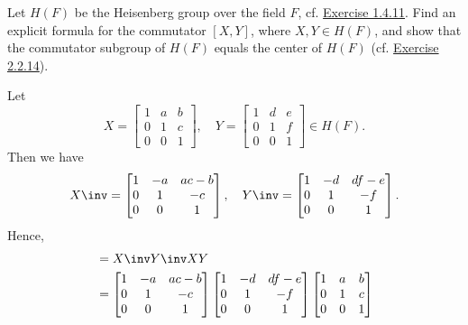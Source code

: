 \begin{exercise}\label{ex5.4.20}
    Let $H(F)$ be the Heisenberg group over the field $F$, cf. \hyperref[ex1.4.11]{Exercise 1.4.11}. Find an explicit formula for the commutator $[X, Y]$, where $X, Y \in H(F)$, and show that the commutator subgroup of $H(F)$ equals the center of $H(F)$ (cf. \hyperref[ex2.2.14]{Exercise 2.2.14}).
\end{exercise}

\begin{sol}
    Let
    \[X = 
    \begin{bmatrix}
        1 & a & b \\
        0 & 1 & c \\
        0 & 0 & 1
    \end{bmatrix}, \quad
    Y = 
    \begin{bmatrix}
        1 & d & e \\
        0 & 1 & f \\
        0 & 0 & 1
    \end{bmatrix} \in H(F).\]
    Then we have
    \[X\inv =
    \begin{bmatrix}
        1 & -a & ac - b \\
        0 & 1 & -c \\
        0 & 0 & 1
    \end{bmatrix}, \quad
    Y\inv =
    \begin{bmatrix}
        1 & -d & df - e \\
        0 & 1 & -f \\
        0 & 0 & 1
    \end{bmatrix}.\]
    Hence,
    \begin{align*}
        [X, Y] & = X\inv Y\inv XY \\
        & =
        \begin{bmatrix}
            1 & -a & ac - b \\
            0 & 1 & -c \\
            0 & 0 & 1
        \end{bmatrix}
        \begin{bmatrix}
            1 & -d & df - e \\
            0 & 1 & -f \\
            0 & 0 & 1
        \end{bmatrix}
        \begin{bmatrix}
            1 & a & b \\
            0 & 1 & c \\
            0 & 0 & 1

\end{bmatrix}
\end{align*}
\end{sol}
